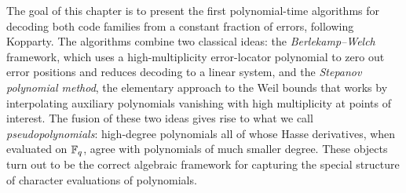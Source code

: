 The goal of this chapter is to present the first polynomial-time algorithms for decoding both code families from a constant fraction of errors, following Kopparty. The algorithms combine two classical ideas: the \emph{Berlekamp--Welch} framework, which uses a high-multiplicity error-locator polynomial to zero out error positions and reduces decoding to a linear system, and the \emph{Stepanov polynomial method}, the elementary approach to the Weil bounds that works by interpolating auxiliary polynomials vanishing with high multiplicity at points of interest. The fusion of these two ideas gives rise to what we call \emph{pseudopolynomials}: high-degree polynomials all of whose Hasse derivatives, when evaluated on $\mathbb{F}_q$, agree with polynomials of much smaller degree. These objects turn out to be the correct algebraic framework for capturing the special structure of character evaluations of polynomials.



